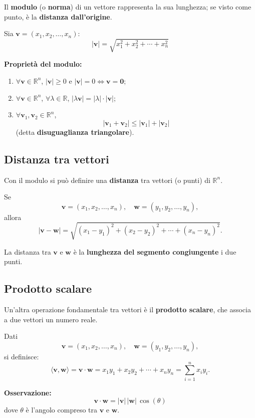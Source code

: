 Il \textbf{modulo} (o \textbf{norma}) di un vettore rappresenta la sua lunghezza; se visto come punto, è la \textbf{distanza dall’origine}.

Sia $\mathbf{v} = (x_1, x_2, \ldots, x_n)$:
\[
|\mathbf{v}| = \sqrt{x_1^2 + x_2^2 + \cdots + x_n^2}
\]

\textbf{Proprietà del modulo:}
\begin{enumerate}
    \item $\forall \mathbf{v} \in \mathbb{R}^n$, $|\mathbf{v}| \ge 0$ e $|\mathbf{v}| = 0 \Leftrightarrow \mathbf{v} = \mathbf{0}$;
    \item $\forall \mathbf{v} \in \mathbb{R}^n$, $\forall \lambda \in \mathbb{R}$, $|\lambda \mathbf{v}| = |\lambda| \cdot |\mathbf{v}|$;
    \item $\forall \mathbf{v}_1, \mathbf{v}_2 \in \mathbb{R}^n$, 
    \[
    |\mathbf{v}_1 + \mathbf{v}_2| \leq |\mathbf{v}_1| + |\mathbf{v}_2|
    \]
    (detta \textbf{disuguaglianza triangolare}).
\end{enumerate}

\subsection{Distanza tra vettori}

Con il modulo si può definire una \textbf{distanza} tra vettori (o punti) di $\mathbb{R}^n$.

Se 
\[
\mathbf{v} = (x_1, x_2, \ldots, x_n), \quad 
\mathbf{w} = (y_1, y_2, \ldots, y_n),
\]
allora
\[
|\mathbf{v} - \mathbf{w}| = \sqrt{(x_1 - y_1)^2 + (x_2 - y_2)^2 + \cdots + (x_n - y_n)^2}.
\]

La distanza tra $\mathbf{v}$ e $\mathbf{w}$ è la \textbf{lunghezza del segmento congiungente} i due punti.

\subsection{Prodotto scalare}

Un’altra operazione fondamentale tra vettori è il \textbf{prodotto scalare}, che associa a due vettori un numero reale.

Dati
\[
\mathbf{v} = (x_1, x_2, \ldots, x_n), \quad 
\mathbf{w} = (y_1, y_2, \ldots, y_n),
\]
si definisce:
\[
\langle \mathbf{v}, \mathbf{w} \rangle = \mathbf{v} \cdot \mathbf{w} = x_1 y_1 + x_2 y_2 + \cdots + x_n y_n = \sum_{i=1}^{n} x_i y_i.
\]

\textbf{Osservazione:}
\[
\mathbf{v} \cdot \mathbf{w} = |\mathbf{v}| \, |\mathbf{w}| \, \cos(\theta)
\]
dove $\theta$ è l’angolo compreso tra $\mathbf{v}$ e $\mathbf{w}$.

